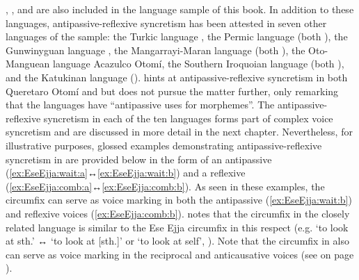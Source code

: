 \newpage
{}, , and  are also included in the language sample of this book. In addition to these languages, antipassive-reflexive syncretism has been attested in seven other languages of the sample: the Turkic language , the Permic language  (both ), the Gunwinyguan language , the Mangarrayi-Maran language  (both ), the Oto-Man\-guean language Acazulco Otomí, the Southern Iroquoian language  (both ), and the Katukinan language  (). \citet[169]{heaton:2017} hints at antipassive-reflexive syncretism in both Queretaro Otomí and  but does not pursue the matter further, only remarking that the languages have “antipassive uses for  morphemes”. The antipassive-reflexive syncretism in each of the ten languages forms part of complex voice syncretism and are discussed in more detail in the next chapter. Nevertheless, for illustrative purposes, glossed examples demonstrating antipassive-reflexive syncretism in  are provided below in the form of an antipassive  (\ref{ex:EseEjja:wait:a}↔\ref{ex:EseEjja:wait:b}) and a reflexive  (\ref{ex:EseEjja:comb:a}↔\ref{ex:EseEjja:comb:b}). As seen in these examples, the circumfix  can serve as voice marking in both the antipassive (\ref{ex:EseEjja:wait:b}) and reflexive voices (\ref{ex:EseEjja:comb:b}). \citet[162]{janic:2010} notes that the circumfix  in the closely related language  is similar to the Ese Ejja circumfix  in this respect (e.g.  ‘to look at sth.’ ↔  ‘to look at [sth.]’ or ‘to look at self’, \citealt[268]{guillaume:2008}). Note that the circumfix in  also can serve as voice marking in the reciprocal and anticausative voices (see  on page \pageref{tab:ch5:antp-refl-recp-antc}). 

